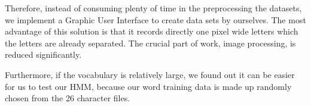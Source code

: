 Therefore, instead of consuming plenty of time in the preprocessing the datasets, we implement a Graphic User Interface to create data sets by ourselves. The most advantage of this solution is that it records directly one pixel wide letters which the letters are already separated. The crucial part of work, image processing, is reduced significantly.

Furthermore, if the vocabulary is relatively large, we found out it can be easier for us to test our HMM, because our word training data is made up randomly chosen from the 26 character files.



